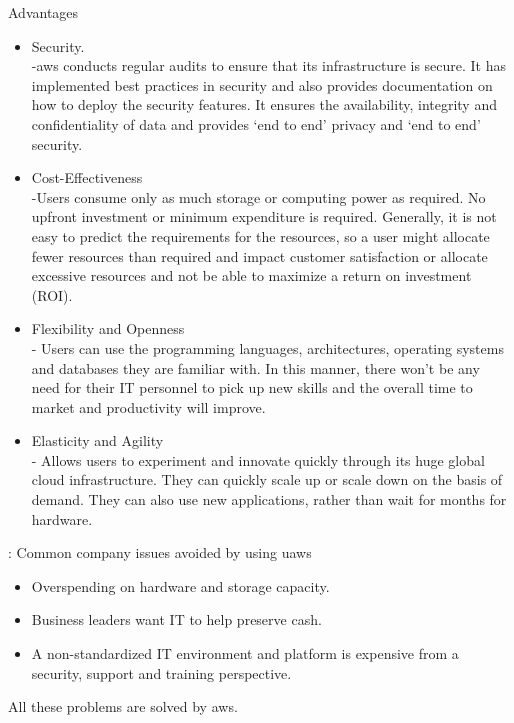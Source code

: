 \documentclass[thesis=M,english]{FITthesis}[2012/06/26]
\begin{document}
Advantages\cite{ml_aws_advantages} 
\begin{itemize}[nosep]
	\item Security.\\
-\acrshort{aws} conducts regular audits to ensure that its infrastructure is secure. It has implemented best practices in security and also provides documentation on how to deploy the security features. It ensures the availability, integrity and confidentiality of data and provides ‘end to end’ privacy and ‘end to end’ security.
	\item Cost-Effectiveness\\
-Users consume only as much storage or computing power as required. No upfront investment or minimum expenditure is required. Generally, it is not easy to predict the requirements for the resources, so a user might allocate fewer resources than required and impact customer satisfaction or allocate excessive resources and not be able to maximize a return on investment (ROI).
	\item Flexibility and Openness\\
- Users can use the programming languages, architectures, operating systems and databases they are familiar with. In this manner, there won’t be any need for their IT personnel to pick up new skills and the overall time to market and productivity will improve. 
	\item Elasticity and Agility\\
- Allows users to experiment and innovate quickly through its huge global cloud infrastructure. They can quickly scale up or scale down on the basis of demand. They can also use new applications, rather than wait for months for hardware.\\
\end{itemize}

\cite{ml_aws_benefits}: Common company issues avoided by using u\acrshort{aws}
\begin{itemize}[nosep]
\item Overspending on hardware and storage capacity. 
\item Business leaders want IT to help preserve cash. 
\item A non-standardized IT environment and platform is expensive from a security, support and training perspective.\\
\end{itemize}

All these problems are solved by \acrshort{aws}.\\
\end{document}
